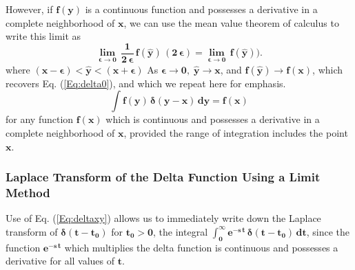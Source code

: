 \documentclass[12pt]{article}
\begin{document}
\noindent However, if $\mathbf{f(y)}$ is a continuous function and possesses a derivative
  in a complete neighborhood of $\mathbf{x}$, we can use the mean value theorem of
  calculus to write this limit as
\begin{equation}
\mathbf{ \boldsymbol{\lim_{\epsilon \rightarrow 0}} \,\frac{1}{2\,\boldsymbol{\epsilon}}\,
          f(\hat{y})\, (2\,\boldsymbol{\epsilon}) =
		  \boldsymbol{\lim_{\epsilon \rightarrow 0}} \,f(\hat{y})) }.
\end{equation}
where $\mathbf{ (x -\boldsymbol{\epsilon}) < \hat{y} < (x +\boldsymbol{\epsilon}) }$
As $\mathbf{\boldsymbol{\epsilon \rightarrow 0},\; \hat{y} \rightarrow x}$, 
  and $\mathbf{f(\hat{y}) \rightarrow f(x)}$,
  which recovers Eq. (\ref{Eq:delta0}), and which we repeat here for emphasis.
\begin{equation}  \label{Eq:deltaxy}
  \mathbf{\int f(y)\,\boldsymbol{\delta}(y-x)\,dy = f(x) }
\end{equation}
for any function $\mathbf{f(x)}$ which is continuous and possesses a derivative
  in a complete neighborhood of $\mathbf{x}$, provided the range of integration
  includes the point $\mathbf{x}$.
\subsubsection{Laplace Transform of the Delta Function Using a Limit Method} \label{dirac2}
Use of Eq. (\ref{Eq:deltaxy}) allows us to immediately write down the Laplace
  transform of $\mathbf{\boldsymbol{\delta}(t - t_{0})}$ for $\mathbf{t_{0} > 0}$, the integral
  $\mathbf{\int_{0}^{\infty}  e^{-s\,t}\, \boldsymbol{\delta}(t - t_{0})\,dt}$,
  since the function $\mathbf{e^{-s\,t}}$ which multiplies the delta function is continuous and
  possesses a derivative for all values of $\mathbf{t}$.\\
  
\end{document}
